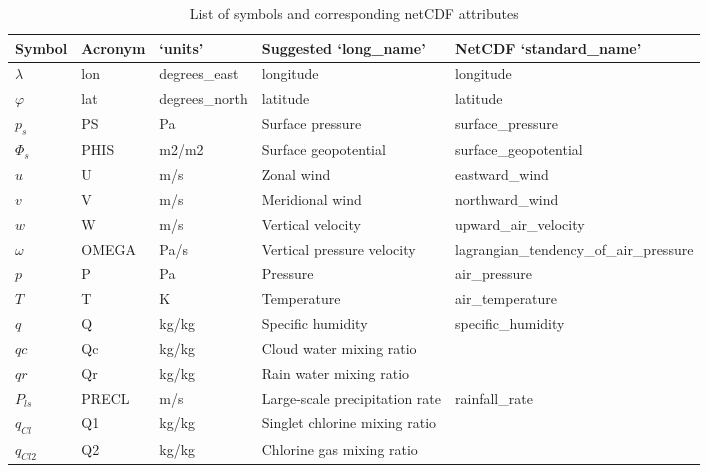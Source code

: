 \documentclass[times,doublespace]{fldauth}
\begin{document}
{\begin{appendix}
\begin{table}[h]
\caption{List of symbols and corresponding netCDF attributes} \label{tab:netcdf}
\begin{tabular*}{\textwidth}{@{\extracolsep{\fill}}lllll}
\hline Symbol & Acronym & `units' & Suggested `long\_name'  & NetCDF `standard\_name' \\ \hline 
$\lambda$ & lon & degrees\_east & longitude & longitude \\
$\varphi$ & lat & degrees\_north & latitude & latitude \\
$p_s$ & PS & Pa & Surface pressure & surface\_pressure\\
$\Phi_s$ & PHIS & m2/m2 &  Surface geopotential & surface\_geopotential\\
$u$ & U & m/s &  Zonal wind & eastward\_wind \\
$v$ & V & m/s & Meridional wind & northward\_wind\\
$w$ & W & m/s & Vertical velocity & upward\_air\_velocity\\
$\omega$ & OMEGA & Pa/s & Vertical pressure velocity & lagrangian\_tendency\_of\_air\_pressure \\
$p$ & P & Pa & Pressure & air\_pressure\\
$T$ & T & K & Temperature & air\_temperature\\
$q$ & Q & kg/kg & Specific humidity & specific\_humidity\\
$qc$ & Qc & kg/kg & Cloud water mixing ratio & \\
$qr$ & Qr & kg/kg & Rain water mixing ratio & \\
$P_{ls}$ & PRECL & m/s & Large-scale precipitation rate & rainfall\_rate\\
$q_{Cl}$ & Q1 & kg/kg & Singlet chlorine mixing ratio & \\
$q_{Cl2}$ & Q2 & kg/kg & Chlorine gas mixing ratio & \\
\hline 
\end{tabular*}
\end{table}


\end{appendix}}
\end{document}
